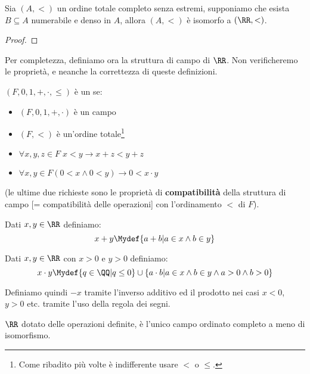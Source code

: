 \documentclass[11pt]{scrartcl}
\begin{document}
\begin{proposition}[Caratterizzazione di $(\RR,<)$]
	Sia $(A,<)$ un ordine totale completo senza estremi, supponiamo che esista $B \subseteq A$ numerabile e denso in $A$, allora 
	$(A,<)$ è isomorfo a $(\RR,<)$.
\end{proposition}

\begin{proof}
	
\end{proof}

Per completezza, definiamo ora la struttura di campo di $\RR$. Non verificheremo le proprietà, e neanche la correttezza di queste definizioni.

\begin{definition}
	$(F,0,1,+,\cdot,\leq)$ è un  se:
	\begin{itemize}
		\item $(F,0,1,+,\cdot)$ è un campo
		\item $(F,<)$ è un'ordine totale\footnote{Come ribadito più volte è indifferente usare $<$ o $\leq$.}
		\item $\forall x,y,z \in F \; x < y \rightarrow x + z < y + z$
		\item $\forall x,y \in F (0 < x \land 0 < y) \rightarrow 0 < x \cdot y$
	\end{itemize}
	(le ultime due richieste sono le proprietà di \textbf{compatibilità} della struttura di campo [= compatibilità delle operazioni] con l'ordinamento $<$ di $F$).
\end{definition}

\begin{definition}[Somma su $\RR$]
	Dati $x,y \in \RR$ definiamo:
	\[ x + y \Mydef \{a + b | a \in x \land b \in y\}
		\]
\end{definition}

\begin{definition}[Prodotto su $\RR$]
	Dati $x,y \in \RR$ con $x > 0$ e $y > 0$ definiamo:
	\[ x \cdot y \Mydef \{q \in \QQ | q \leq 0\} \cup \{a\cdot b | a \in x  \land b \in y \land a > 0 \land b > 0\}
		\]
\end{definition}

Definiamo quindi $-x$ tramite l'inverso additivo ed il prodotto nei casi $x < 0$, $y>0$ etc. tramite l'uso della regola dei segni.

\begin{theorem}
	$\RR$ dotato delle operazioni definite, è l'unico campo ordinato completo a meno di isomorfismo.
\end{theorem}
\end{document}
